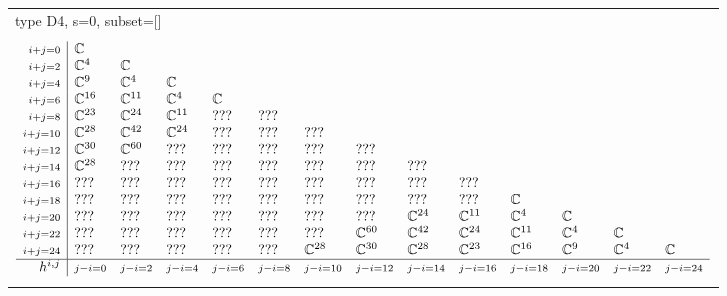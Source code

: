 \documentclass[crop,border=2mm]{standalone}
\begin{document}
\begin{tabular}{l}
{\huge type D4, s=0, subset=[]}\\ \\


$\displaystyle
\begin{array}{r|l l l l l l l l l l l l l}
	{\scriptstyle i+j=0}&\mathbb{C}&&&&&&&&&&&&\\
	{\scriptstyle i+j=2}&\mathbb{C}^{4}&\mathbb{C}&&&&&&&&&&&\\
	{\scriptstyle i+j=4}&\mathbb{C}^{9}&\mathbb{C}^{4}&\mathbb{C}&&&&&&&&&&\\
	{\scriptstyle i+j=6}&\mathbb{C}^{16}&\mathbb{C}^{11}&\mathbb{C}^{4}&\mathbb{C}&&&&&&&&&\\
	{\scriptstyle i+j=8}&\mathbb{C}^{23}&\mathbb{C}^{24}&\mathbb{C}^{11}&???&???&&&&&&&&\\
	{\scriptstyle i+j=10}&\mathbb{C}^{28}&\mathbb{C}^{42}&\mathbb{C}^{24}&???&???&???&&&&&&&\\
	{\scriptstyle i+j=12}&\mathbb{C}^{30}&\mathbb{C}^{60}&???&???&???&???&???&&&&&&\\
	{\scriptstyle i+j=14}&\mathbb{C}^{28}&???&???&???&???&???&???&???&&&&&\\
	{\scriptstyle i+j=16}&???&???&???&???&???&???&???&???&???&&&&\\
	{\scriptstyle i+j=18}&???&???&???&???&???&???&???&???&???&\mathbb{C}&&&\\
	{\scriptstyle i+j=20}&???&???&???&???&???&???&???&\mathbb{C}^{24}&\mathbb{C}^{11}&\mathbb{C}^{4}&\mathbb{C}&&\\
	{\scriptstyle i+j=22}&???&???&???&???&???&???&\mathbb{C}^{60}&\mathbb{C}^{42}&\mathbb{C}^{24}&\mathbb{C}^{11}&\mathbb{C}^{4}&\mathbb{C}&\\
	{\scriptstyle i+j=24}&???&???&???&???&???&\mathbb{C}^{28}&\mathbb{C}^{30}&\mathbb{C}^{28}&\mathbb{C}^{23}&\mathbb{C}^{16}&\mathbb{C}^{9}&\mathbb{C}^{4}&\mathbb{C}\\
	\hline h^{i,j}&{\scriptstyle j-i=0}&{\scriptstyle j-i=2}&{\scriptstyle j-i=4}&{\scriptstyle j-i=6}&{\scriptstyle j-i=8}&{\scriptstyle j-i=10}&{\scriptstyle j-i=12}&{\scriptstyle j-i=14}&{\scriptstyle j-i=16}&{\scriptstyle j-i=18}&{\scriptstyle j-i=20}&{\scriptstyle j-i=22}&{\scriptstyle j-i=24}
\end{array}
$ \\ \\



\end{tabular}
\end{document}
